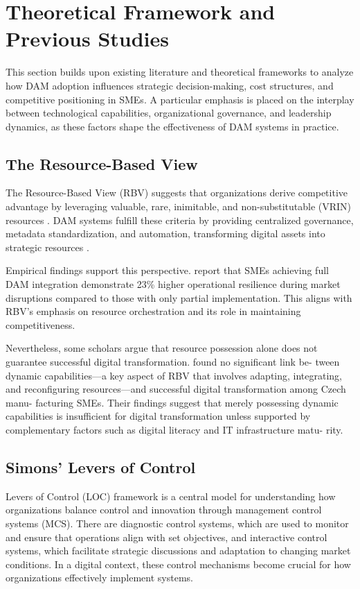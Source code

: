 \documentclass[a4paper,12pt,twocolumn]{article}
\begin{document}
\justifying
\fussy

\section{Theoretical Framework and Previous Studies}
This section builds upon existing literature and theoretical frameworks to analyze how DAM adoption influences 
strategic decision-making, cost structures, and competitive positioning in SMEs. A particular emphasis is placed 
on the interplay between technological capabilities, organizational governance, and leadership dynamics,
as these factors shape the effectiveness of DAM systems in practice.


\subsection{The Resource-Based View}
The Resource-Based View (RBV) suggests that organizations derive competitive advantage by leveraging valuable, rare, inimitable, 
and non-substitutable (VRIN) resources \cite{barney1991}. DAM systems fulfill these criteria by providing centralized governance,
metadata standardization, and automation, transforming digital assets into strategic resources \cite{Chumphong2020}.

\vspace{0.3cm}
Empirical findings support this perspective. \cite{Chumphong2020} report that SMEs achieving full DAM integration 
demonstrate 23\% higher operational resilience during market disruptions compared to those with only partial implementation. 
This aligns with RBV’s emphasis on resource orchestration and its role in maintaining competitiveness.

\vspace{0.3cm}
Nevertheless, some scholars argue that resource possession alone does not guarantee successful digital transformation. 
\cite{Civelek2023} found no significant link be-
tween dynamic capabilities—a key aspect
of RBV that involves adapting, integrating,
and reconfiguring resources—and successful
digital transformation among Czech manu-
facturing SMEs. Their findings suggest that
merely possessing dynamic capabilities is
insufficient for digital transformation unless
supported by complementary factors such as
digital literacy and IT infrastructure matu-
rity.

\subsection{Simons’ Levers of Control}
\cite{simons1995} Levers of Control (LOC) framework is a central model for understanding how organizations 
balance control and innovation through management control systems (MCS). 
There are diagnostic control systems, which are used to monitor and ensure that operations 
align with set objectives, and interactive control systems, which facilitate strategic discussions and adaptation to 
changing market conditions. In a digital context, these control mechanisms become crucial for how organizations effectively 
implement systems.
\end{document}
